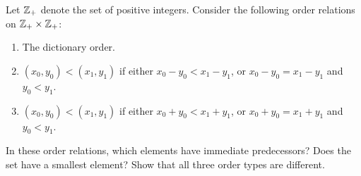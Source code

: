 \documentclass[../main.tex]{subfiles}
\begin{document}
\problem{}\label{s3p12}

Let \({\mathbb{Z}}_{+}\) denote the set of positive integers. Consider the following
order relations on \({\mathbb{Z}}_{+} \times {\mathbb{Z}}_{+}\):
\begin{enumerate}
	\item The dictionary order.
	\item \(({x_0},{y_0})<({x_1},{y_1})\) if either
		\({x_0}-{y_0}<{x_1}-{y_1}\), or \({x_0}-{y_0}={x_1}-{y_1}\) and
		\({y_0}<{y_1}\).
	\item \(({x_0},{y_0})<({x_1},{y_1})\) if either
		\({x_0}+{y_0}<{x_1}+{y_1}\), or \({x_0}+{y_0}={x_1}+{y_1}\) and
		\({y_0}<{y_1}\).
\end{enumerate}
In these order relations, which elements have immediate predecessors? Does the
set have a smallest element? Show that all three order types are different.

\todo{}
\end{document}
